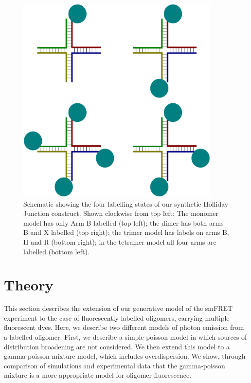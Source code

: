 \begin{figure}
   \begin{center}
      \includegraphics*[clip=true, width=4in]{sizing/holliday_junction_labelling.pdf}
      \caption{Schematic showing the four labelling states of our synthetic Holliday Junction construct. Shown clockwise from top left: The monomer model has only Arm B labelled (top left); the dimer has both arms B and X labelled (top right); the trimer model has labels on arms B, H and R (bottom right); in the tetramer model all four arms are labelled (bottom left).}
      \label{fig:holliday_junction_labelling}
   \end{center}
\end{figure}

\section{Theory}

This section describes the extension of our generative model of the smFRET experiment to the case of fluorescently labelled oligomers, carrying multiple fluorescent dyes. Here, we describe two different models of photon emission from a labelled oligomer. First, we describe a simple poisson model in which sources of distribution broadening are not considered. We then extend this model to a gamma-poisson mixture model, which includes overdispersion. We show, through comparison of simulations and experimental data that the gamma-poisson mixture is a more appropriate model for oligomer fluorescence.

